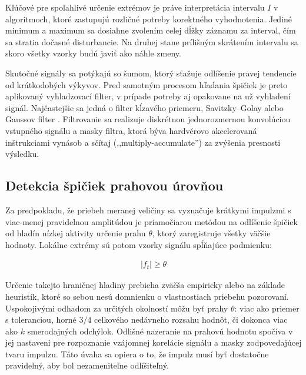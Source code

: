 Kľúčové pre spoľahlivé určenie extrémov je práve interpretácia intervalu $I$ v algoritmoch, ktoré zastupujú rozličné
potreby korektného vyhodnotenia. Jediné minimum a maximum sa dosiahne zvolením celej dĺžky záznamu za interval, čím sa
stratia dočasné disturbancie. Na druhej stane prílišným skrátením intervalu sa skoro všetky vzorky budú javiť ako náhle zmeny.

Skutočné signály sa potýkajú so šumom, ktorý sťažuje odlíšenie pravej tendencie od krátkodobých výkyvov.
Pred samotným procesom hľadania špičiek je preto aplikovaný vyhladzovací filter, v prípade potreby aj opakovane na už
vyhladení signál. Najčastejšie sa jedná o filter
kĺzavého priemeru, Savitzky–Golay alebo Gaussov filter \cite{spectrometry-peak-detection}. Filtrovanie sa realizuje
diskrétnou jednorozmernou konvolúciou vstupného signálu a masky filtra, ktorá býva hardvérovo akcelerovaná inštrukciami vynásob a sčítaj 
(,,multiply-accumulate'') za zvýšenia presnosti výsledku.

\subsection{Detekcia špičiek prahovou úrovňou}
Za predpokladu, že priebeh meranej veličiny sa vyznačuje krátkymi impulzmi s viac-menej pravidelnou amplitúdou
je priamočiarou metódou na odlíšenie špičiek od hladín nízkej aktivity určenie prahu $\theta$, ktorý zaregistruje
všetky väčšie hodnoty. Lokálne extrémy sú potom vzorky signálu spĺňajúce podmienku:
\begin{ceqn}\begin{align}
|f_t| \geq \theta
\end{align}\end{ceqn}

Určenie takejto hraničnej hladiny prebieha zväčša empiricky alebo na základe heuristík, ktoré so sebou nesú
domnienku o vlastnostiach priebehu pozorovaní. Uspokojivými odhadom za určitých okolností môžu byť prahy $\theta$:
viac ako priemer s toleranciou, horné $3/4$ celkového nedávneho rozsahu hodnôt, či dokonca viac ako $k$
smerodajných odchýlok. Odlišné nazeranie na prahovú hodnotu spočíva v jej nastavení pre rozpoznanie
vzájomnej korelácie signálu a masky zodpovedajúcej tvaru impulzu. Táto úvaha sa opiera o to, že impulz
musí byť dostatočne pravidelný, aby bol nezameniteľne odlíšiteľný.

